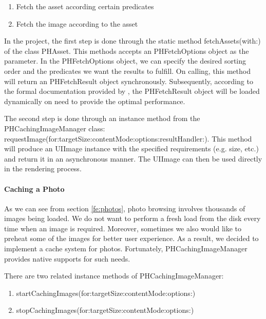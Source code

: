 \documentclass[12pt,a4paper]{article}
\renewcommand\texttt[1]{{\ttfamily\color{textttColor}#1}}
\begin{document}
                \begin{enumerate}
                    \setlength\itemsep{-0.5em}
                    \item Fetch the asset according certain predicates
                    \item Fetch the image according to the asset
                \end{enumerate}
                
                In the project, the first step is done through the static method \texttt{fetchAssets(with:)} of the class \texttt{PHAsset}. This methods accepts an \texttt{PHFetchOptions} object as the parameter. In the \texttt{PHFetchOptions} object, we can specify the desired sorting order and the predicates we want the results to fulfill. On calling, this method will return an \texttt{PHFetchResult} object synchronously. Subsequently, according to the formal documentation provided by \citet{PHFetchResultWebsite}, the \texttt{PHFetchResult} object will be loaded dynamically on need to provide the optimal performance.
                
                The second step is done through an instance method from the \texttt{PHCachingImageManager} class:  \texttt{requestImage(for:targetSize:contentMode:options:resultHandler:)}. This method will produce an \texttt{UIImage} instance with the specified requirements (e.g. size, etc.) and return it in an asynchronous manner. The \texttt{UIImage} can then be used directly in the rendering process.
                
            \paragraph{Caching a Photo}
            
            As we can see from section \ref{fe:photos}, photo browsing involves thousands of images being loaded. We do not want to perform a fresh load from the disk every time when an image is required. Moreover, sometimes we also would like to preheat some of the images for better user experience. As a result, we decided to implement a cache system for photos. Fortunately, \texttt{PHCachingImageManager} provides native supports for such needs.
            
            There are two related instance methods of \texttt{PHCachingImageManager}:
            \begin{enumerate}
                \setlength\itemsep{-0.5em}
                \item \texttt{startCachingImages(for:targetSize:contentMode:options:)}
                \item \texttt{stopCachingImages(for:targetSize:contentMode:options:)}
            \end{enumerate}
            
\end{document}
